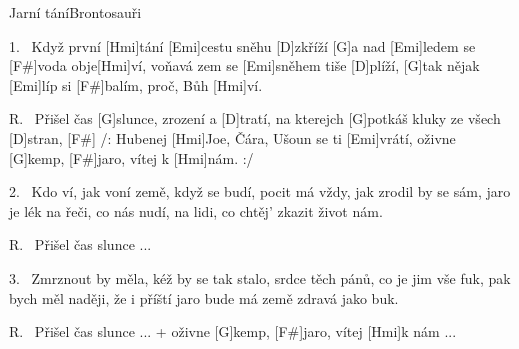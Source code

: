 \begin{song}{Jarní tání}{Brontosauři}

\begin{xverse}{1.~}
Když první [Hmi]tání [Emi]cestu sněhu [D]zkříží
[G]a nad [Emi]ledem se [F#]voda obje[Hmi]ví,
voňavá zem se [Emi]sněhem tiše [D]plíží,
[G]tak nějak [Emi]líp si [F#]balím, proč, Bůh [Hmi]ví.
\end{xverse}

\begin{xverse}{R.~}
Přišel čas [G]slunce, zrození a [D]tratí,
na kterejch [G]potkáš kluky ze všech [D]stran, [F#]{}
/: Hubenej [Hmi]Joe, Čára, Ušoun se ti [Emi]vrátí,
oživne [G]kemp, [F#]jaro, vítej k [Hmi]nám. :/
\end{xverse}

\begin{xverse}{2.~}
Kdo ví, jak voní země, když se budí,
pocit má vždy, jak zrodil by se sám,
jaro je lék na řeči, co nás nudí,
na lidi, co chtěj' zkazit život nám.
\end{xverse}

\begin{xverse}{R.~}
Přišel čas slunce ...
\end{xverse}

\begin{xverse}{3.~}
Zmrznout by měla, kéž by se tak stalo,
srdce těch pánů, co je jim vše fuk,
pak bych měl naději, že i příští jaro
bude má země zdravá jako buk.
\end{xverse}

\begin{xverse}{R.~}
Přišel čas slunce ...
+ oživne [G]kemp, [F#]jaro, vítej [Hmi]k nám ...
\end{xverse}

\end{song}

